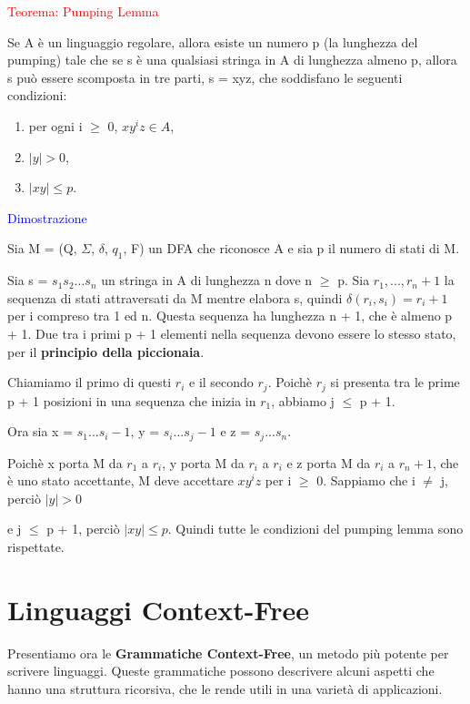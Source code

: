 \documentclass{article}
\begin{document}
\begin{center}
    \textcolor{red}{Teorema: Pumping Lemma}
\end{center}

Se A è un linguaggio regolare, allora esiste un numero p (la lunghezza del
pumping) tale che se s è una qualsiasi stringa in A di lunghezza almeno p,
allora s può essere scomposta in tre parti, s = xyz, che soddisfano le seguenti
condizioni:

\begin{enumerate}
    \item per ogni i $\geq$ 0, $xy^iz \in A$,
    \item $|y| > 0$,
    \item $|xy| \leq p$.
\end{enumerate}

\textcolor{blue}{Dimostrazione}

Sia M = (Q, $\Sigma$, $\delta$, $q_1$, F) un DFA che riconosce A e sia p il
numero di stati di M. 

Sia s = $s_1s_2...s_n$ un stringa in A di lunghezza n dove n $\geq$ p. Sia $r_1,
..., r_n+1$ la sequenza di stati attraversati da M mentre elabora s, quindi
$\delta(r_i,s_i) = r_i+1$ per i compreso tra 1 ed n. Questa sequenza ha
lunghezza n + 1, che è almeno p + 1. Due tra i primi p + 1 elementi nella
sequenza devono essere lo stesso stato, per il \textbf{principio della
piccionaia}. 

Chiamiamo il primo di questi $r_i$ e il secondo $r_j$. Poichè $r_j$ si presenta
tra le prime p + 1 posizioni in una sequenza che inizia in $r_1$, abbiamo j
$\leq$ p + 1. 

Ora sia x = $s_1...s_i-1$, y = $s_i...s_j-1$ e z = $s_j...s_n$.

Poichè x porta M da $r_1$ a $r_i$, y porta M da $r_i$ a $r_i$ e z porta M da
$r_i$ a $r_n+1$, che è uno stato accettante, M deve accettare $xy^iz$ per i
$\geq$ 0. Sappiamo che i $\neq$ j, perciò $|y| > 0$

e j $\leq$ p + 1, perciò $|xy| \leq p$. Quindi tutte le condizioni del pumping
lemma sono rispettate.

\section{Linguaggi Context-Free}

Presentiamo ora le \textbf{Grammatiche Context-Free}, un metodo più potente per
scrivere linguaggi. Queste grammatiche possono descrivere alcuni aspetti che
hanno una struttura ricorsiva, che le rende utili in una varietà di
applicazioni.
\end{document}
